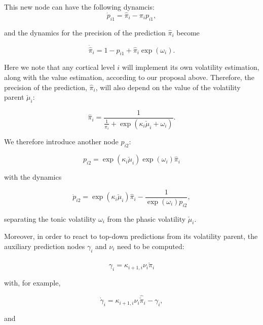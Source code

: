 This new node can have the following dynamcis:
\begin{equation}
	\dot{p}_{i1} = \hat{\pi}_i - \pi_i p_{i1}, 
\end{equation}

and the dynamics for the precision of the prediction $\hat{\pi}_i$ become

\begin{equation}
	\dot{\hat{\pi}}_i = 1 - p_{i1} + \hat{\pi}_i \exp(\omega_i).
\end{equation}

Here we note that any cortical level $i$ will implement its own volatility estimation, along with the value estimation, according to our proposal above. Therefore, the precision of the prediction, $\hat{\pi}_i$, will also depend on the value of the volatility parent $\check{\mu}_i$:

\begin{equation}
	\hat{\pi}_i = \frac{1}{\frac{1}{\pi_i} + \exp(\kappa_i \check{\mu}_i + \omega_i)}.
\end{equation}

We therefore introduce another node $p_{i2}$:

\begin{equation}
	p_{i2} = \exp(\kappa_i \check{\mu}_i) \exp(\omega_i) \hat{\pi}_i
\end{equation}

with the dynamics

\begin{equation}
	\dot{p}_{i2} = \exp(\kappa_i \check{\mu}_i) \hat{\pi}_i - \frac{1}{\exp(\omega_i) p_{i2}},
\end{equation}

separating the tonic volatility $\omega_i$ from the phasic volatility $\check{\mu}_i$.

Moreover, in order to react to top-down predictions from its volatility parent, the auxiliary prediction nodes $\gamma_i$ and $\nu_i$ need to be computed:

\begin{equation}
  \gamma_i = \kappa_{i+1,i} \nu_i \hat{\check{\pi}}_i
\end{equation}

with, for example, 

\begin{equation}
  \dot{\gamma}_i = \kappa_{i+1,i} \nu_i \hat{\check{\pi}}_i - \gamma_i,
\end{equation}

and 

